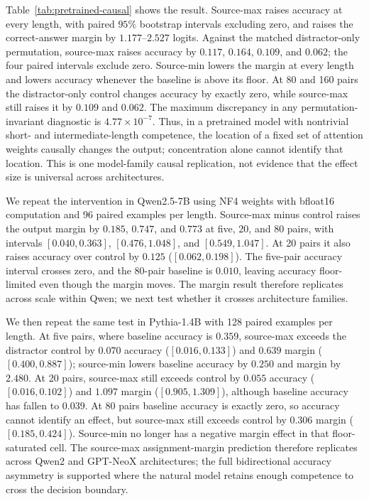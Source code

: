 \documentclass[letterpaper]{article} %
\begin{document}
Table~\ref{tab:pretrained-causal} shows the result. Source-max raises accuracy at every length, with paired
$95\%$ bootstrap intervals excluding zero, and raises the correct-answer margin by $1.177$--$2.527$ logits.
Against the matched distractor-only permutation, source-max raises accuracy by $0.117$, $0.164$, $0.109$,
and $0.062$; the four paired intervals exclude zero.
Source-min lowers the margin at every length and lowers accuracy whenever the baseline is above its floor.
At 80 and 160 pairs the distractor-only control changes accuracy by exactly zero, while source-max still
raises it by $0.109$ and $0.062$. The maximum discrepancy in any permutation-invariant diagnostic is
$4.77\times10^{-7}$. Thus, in a pretrained model with nontrivial short- and intermediate-length competence,
the location of a fixed set of attention weights causally changes the output; concentration alone cannot
identify that location. This is one model-family causal replication, not evidence that the effect size is
universal across architectures.

We repeat the intervention in Qwen2.5-7B using NF4 weights with bfloat16 computation and 96 paired examples
per length. Source-max minus control raises the output margin by $0.185$, $0.747$, and $0.773$ at five, 20,
and 80 pairs, with intervals $[0.040,0.363]$, $[0.476,1.048]$, and $[0.549,1.047]$. At 20 pairs it also
raises accuracy over control by $0.125$ ($[0.062,0.198]$). The five-pair accuracy interval crosses zero,
and the 80-pair baseline is $0.010$, leaving accuracy floor-limited even though the margin moves. The margin
result therefore replicates across scale within Qwen; we next test whether it crosses architecture families.

We then repeat the same test in Pythia-1.4B with 128 paired examples per length. At five pairs, where
baseline accuracy is $0.359$, source-max exceeds the distractor control by $0.070$ accuracy
($[0.016,0.133]$) and $0.639$ margin ($[0.400,0.887]$); source-min lowers baseline accuracy by $0.250$ and
margin by $2.480$. At 20 pairs, source-max still exceeds control by $0.055$ accuracy
($[0.016,0.102]$) and $1.097$ margin ($[0.905,1.309]$), although baseline accuracy has fallen to $0.039$.
At 80 pairs baseline accuracy is exactly zero, so accuracy cannot identify an effect, but source-max still
exceeds control by $0.306$ margin ($[0.185,0.424]$). Source-min no longer has a negative margin effect in
that floor-saturated cell. The source-max assignment-margin prediction therefore replicates across Qwen2
and GPT-NeoX architectures; the full bidirectional accuracy asymmetry is supported where the natural model
retains enough competence to cross the decision boundary.
\end{document}
